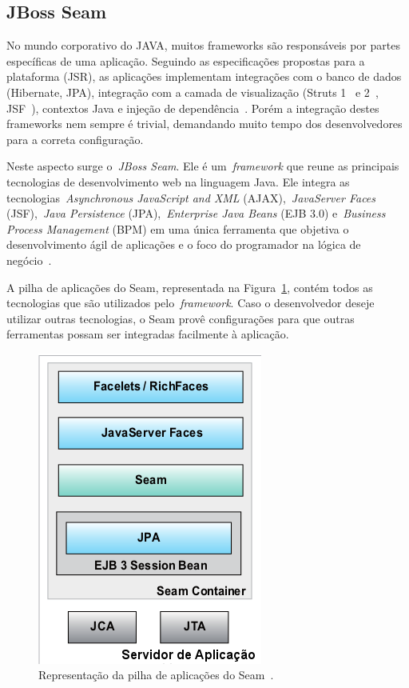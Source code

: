 \subsection{JBoss Seam}

No mundo corporativo do JAVA, muitos frameworks são responsáveis por partes específicas de uma aplicação. Seguindo as especificações propostas para a plataforma (JSR), as aplicações implementam integrações com o banco de dados (Hibernate, JPA), integração com a camada de visualização (Struts 1~\cite{struts1} e 2~\cite{struts2}, JSF~\cite{jsf2012}), contextos Java e injeção de dependência~\cite{di2012}. Porém a integração destes frameworks nem sempre é trivial, demandando muito tempo dos desenvolvedores para a correta configuração.

Neste aspecto surge o~\emph{JBoss Seam}. Ele é um~\emph{framework} que reune as principais tecnologias de desenvolvimento web na linguagem Java. Ele integra as tecnologias~\emph{Asynchronous JavaScript and XML} (AJAX),~\emph{JavaServer Faces} (JSF),~\emph{Java Persistence} (JPA),~\emph{Enterprise Java Beans} (EJB 3.0) e~\emph{Business Process Management} (BPM) em uma única ferramenta que objetiva o desenvolvimento ágil de aplicações e o foco do programador na lógica de negócio~\cite{seamSite}.

A pilha de aplicações do Seam, representada na Figura~\ref{fig:servidor-app-seam}, contém todos as tecnologias que são utilizados pelo~\emph{framework}. Caso o desenvolvedor deseje utilizar outras tecnologias, o Seam provê configurações para que outras ferramentas possam ser integradas facilmente à aplicação.

\begin{figure}
	\centering
	\includegraphics[scale=0.65]{images/servidor-app-seam.png}
	\caption{Representação da pilha de aplicações do Seam~\cite{allen09}.}
	\label{fig:servidor-app-seam}
\end{figure}

